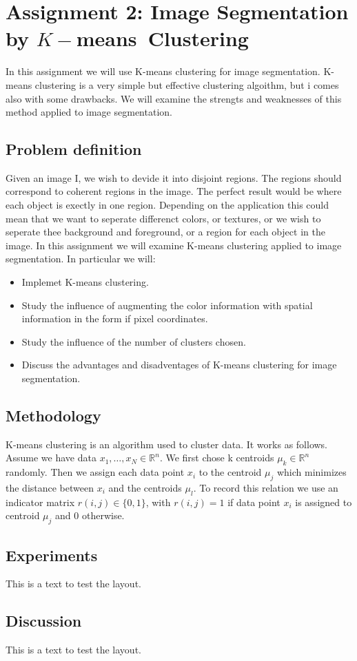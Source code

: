 \section{Assignment 2: Image Segmentation by \texorpdfstring{$K-$means}\ \ Clustering}
\label{sec:assignment2}

In this assignment we will use K-means clustering for image segmentation. K-means clustering is a very simple but effective clustering algoithm, but i comes also with some drawbacks. We will examine the strengts and weaknesses of this method applied to image segmentation.

\subsection{Problem definition}

Given an image I, we wish to devide it into disjoint regions. The regions should correspond to coherent regions in the image. The perfect result would be where each object is exectly in one region. Depending on the application this could mean that we want to seperate differenct colors, or textures, or we wish to seperate thee background and foreground, or a region for each object in the image. In this assignment we will examine K-means clustering applied to image segmentation.
 In particular we will:
\begin{itemize}
	\item Implemet K-means clustering.
	\item Study the influence of augmenting the color information with spatial information in the form if pixel coordinates.
	\item Study the influence of the number of clusters chosen.
	\item Discuss the advantages and disadventages of K-means clustering for image segmentation.
\end{itemize}

\subsection{Methodology}

K-means clustering is an algorithm used to cluster data. It works as follows. Assume we have data $x_1,\ldots,x_N \in \mathbb{R}^n$. We first chose k centroids $\mu_k \in \mathbb{R}^n$ randomly. Then we assign each data point $x_i$ to the centroid $\mu_j$ which minimizes the distance between $x_i$ and the centroids $\mu_l$. To record this relation we use an indicator matrix $r(i,j) \in \{0,1\}$, with $r(i,j)=1$ if data point $x_i$ is assigned to centroid $\mu_j$ and $0$ otherwise. 

\subsection{Experiments}

This is a text to test the layout.

\subsection{Discussion}

This is a text to test the layout.

